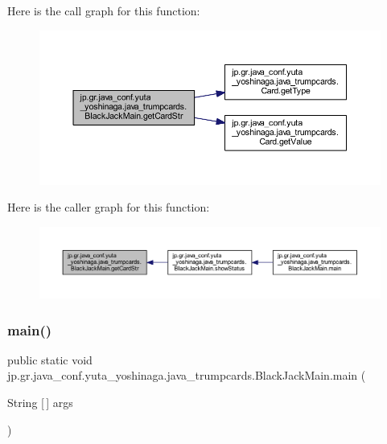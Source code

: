 Here is the call graph for this function\+:
\nopagebreak
\begin{figure}[H]
\begin{center}
\leavevmode
\includegraphics[width=350pt]{classjp_1_1gr_1_1java__conf_1_1yuta__yoshinaga_1_1java__trumpcards_1_1_black_jack_main_a1f14eabe7d9a1438959860e323c39a6f_cgraph}
\end{center}
\end{figure}
Here is the caller graph for this function\+:
\nopagebreak
\begin{figure}[H]
\begin{center}
\leavevmode
\includegraphics[width=350pt]{classjp_1_1gr_1_1java__conf_1_1yuta__yoshinaga_1_1java__trumpcards_1_1_black_jack_main_a1f14eabe7d9a1438959860e323c39a6f_icgraph}
\end{center}
\end{figure}
\mbox{\label{classjp_1_1gr_1_1java__conf_1_1yuta__yoshinaga_1_1java__trumpcards_1_1_black_jack_main_af395b1fc47f9ef84101a3c13c2310ed6}} 
\subsubsection{\texorpdfstring{main()}{main()}}
{\footnotesize\ttfamily public static void jp.\+gr.\+java\+\_\+conf.\+yuta\+\_\+yoshinaga.\+java\+\_\+trumpcards.\+Black\+Jack\+Main.\+main (\begin{DoxyParamCaption}\item[{String \mbox{[}$\,$\mbox{]}}]{args }\end{DoxyParamCaption})\hspace{0.3cm}{\ttfamily [static]}}



